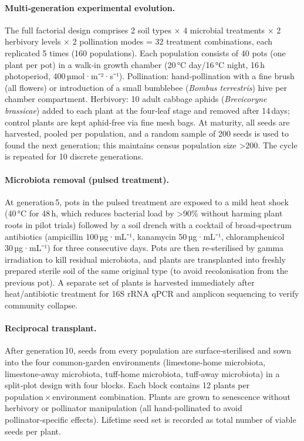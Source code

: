 \documentclass{article}
\begin{document}
\paragraph{Multi‑generation experimental evolution.} The full factorial design comprises 2 soil types × 4 microbial treatments × 2 herbivory levels × 2 pollination modes = 32 treatment combinations, each replicated 5 times (160 populations). Each population consists of 40 pots (one plant per pot) in a walk‑in growth chamber (20 °C day/16 °C night, 16 h photoperiod, 400 µmol·m⁻²·s⁻¹). Pollination: hand‑pollination with a fine brush (all flowers) or introduction of a small bumblebee (\textit{Bombus terrestris}) hive per chamber compartment. Herbivory: 10 adult cabbage aphids (\textit{Brevicoryne brassicae}) added to each plant at the four‑leaf stage and removed after 14 days; control plants are kept aphid‑free via fine mesh bags. At maturity, all seeds are harvested, pooled per population, and a random sample of 200 seeds is used to found the next generation; this maintains census population size >200. The cycle is repeated for 10 discrete generations.

\paragraph{Microbiota removal (pulsed treatment).} At generation 5, pots in the pulsed treatment are exposed to a mild heat shock (40 °C for 48 h, which reduces bacterial load by >90\% without harming plant roots in pilot trials) followed by a soil drench with a cocktail of broad‑spectrum antibiotics (ampicillin 100 µg·mL⁻¹, kanamycin 50 µg·mL⁻¹, chloramphenicol 30 µg·mL⁻¹) for three consecutive days. Pots are then re‑sterilised by gamma irradiation to kill residual microbiota, and plants are transplanted into freshly prepared sterile soil of the same original type (to avoid recolonisation from the previous pot). A separate set of plants is harvested immediately after heat/antibiotic treatment for 16S rRNA qPCR and amplicon sequencing to verify community collapse.

\paragraph{Reciprocal transplant.} After generation 10, seeds from every population are surface‑sterilised and sown into the four common‑garden environments (limestone‑home microbiota, limestone‑away microbiota, tuff‑home microbiota, tuff‑away microbiota) in a split‑plot design with four blocks. Each block contains 12 plants per population × environment combination. Plants are grown to senescence without herbivory or pollinator manipulation (all hand‑pollinated to avoid pollinator‑specific effects). Lifetime seed set is recorded as total number of viable seeds per plant.
\end{document}
